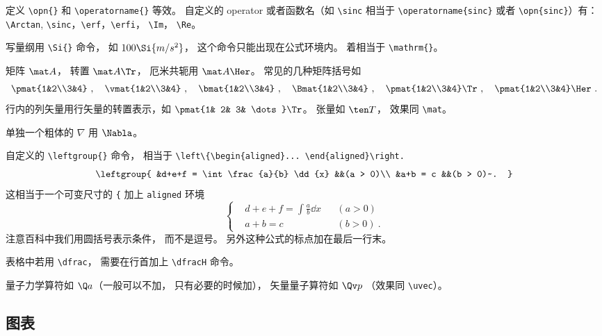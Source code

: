 定义 \verb|\opn{}| 和 \verb|\operatorname{}| 等效。 自定义的 operator 或者函数名（如 \verb|\sinc| 相当于 \verb|\operatorname{sinc}| 或者 \verb|\opn{sinc}|）有： \verb|\Arctan|, \verb|\sinc|，\verb|\erf|，\verb|\erfi|， \verb|\Im|， \verb|\Re|。

写量纲用 \verb|\Si{}| 命令， 如 $100\Si{m/s^2}$， 这个命令只能出现在公式环境内。 着相当于 \verb|\mathrm{}|。

矩阵 $\mat A$， 转置 $\mat A\Tr$， 厄米共轭用 $\mat A\Her$。 常见的几种矩阵括号如
\begin{equation}
\pmat{1&2\\3&4}~, \quad
\vmat{1&2\\3&4}~, \quad 
\bmat{1&2\\3&4}~, \quad
\Bmat{1&2\\3&4}~, \quad
\pmat{1&2\\3&4}\Tr~, \quad
\pmat{1&2\\3&4}\Her~.
\end{equation}
行内的列矢量用行矢量的转置表示，如 $\pmat{1& 2& 3& \dots}\Tr$。 张量如 $\ten T$， 效果同 \verb|\mat|。

单独一个粗体的 $\nabla$ 用 $\Nabla$。

自定义的 \verb|\leftgroup{}| 命令， 相当于 \verb|\left\{\begin{aligned}... \end{aligned}\right.|
\begin{equation}
\leftgroup{
&d+e+f = \int \frac{a}{b} \dd{x} &&(a > 0)\\
&a+b = c &&(b > 0)~.
}
\end{equation}
这相当于一个可变尺寸的 \verb|{| 加上 \verb|aligned| 环境
\begin{equation}
\left\{
\begin{aligned}
&d+e+f = \int \frac{a}{b} \dd{x} &&(a > 0)\\
&a+b = c &&(b > 0)~.
\end{aligned}
\right.
\end{equation}
注意百科中我们用圆括号表示条件， 而不是逗号。 另外这种公式的标点加在最后一行末。

表格中若用 \verb|\dfrac|， 需要在行首加上 \verb|\dfracH| 命令。%

量子力学算符如 $\Q a$（一般可以不加， 只有必要的时候加）， 矢量量子算符如 $\Qv p$ （效果同 \verb|\uvec|）。

\subsection{图表}


